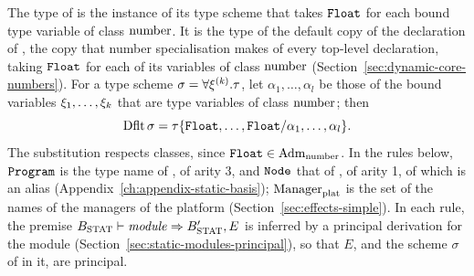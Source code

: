 The type of  is the instance of its type scheme that takes $\mathtt{Float}$
for each bound type variable of class $\mathrm{number}$. It is the type of the default
copy of the declaration of , the copy that number specialisation
makes of every top-level declaration, taking $\mathtt{Float}$ for each of its variables
of class $\mathrm{number}$ (Section~\ref{sec:dynamic-core-numbers}). %
For a type scheme $\sigma=\forall\xi^{(k)}.\tau$, let
$\alpha_1,\ldots,\alpha_l$ be those of the bound variables
$\xi_1,\ldots,\xi_k$ that are type variables of class $\mathrm{number}$; then
\[
  \mathrm{Dflt}\,\sigma=\tau\{\mathtt{Float},\ldots,\mathtt{Float}/\alpha_1,\ldots,\alpha_l\} .
\]
The substitution respects classes, since $\mathtt{Float}\in\mathrm{Adm}_{\mathrm{number}}$. In the rules
below, $\mathtt{Program}$ is the type name of , of arity 3,
and $\mathtt{Node}$ that of , of arity 1, of which  is
an alias (Appendix~\ref{ch:appendix-static-basis}); $\mathrm{Manager}_{\mathrm{plat}}$ is the set
of the names of the managers of the platform
(Section~\ref{sec:effects-simple}). In each rule, the premise
$B_{\mathrm{STAT}} \vdash \mathit{module} \Rightarrow B_{\mathrm{STAT}}',E$ is inferred by a principal derivation for
the module (Section~\ref{sec:static-modules-principal}), so that $E$, and the
scheme $\sigma$ of  in it, are principal. %


  {\jstat{\pgBstat}{\modm\ \program}{(\tau,\PE)}}

  {}

  {}

